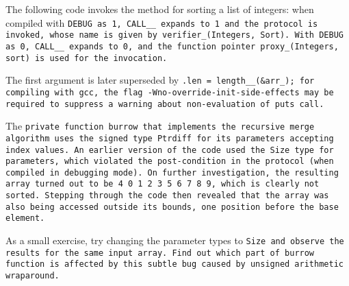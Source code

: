\pagebreak

\example The following code invokes the method for sorting a list of integers:
when compiled with \tt{DEBUG} as \tt{1}, \tt{CALL__} expands to \tt{1} and the
protocol is invoked, whose name is given by \tt{verifier_(Integers, Sort)}.
With \tt{DEBUG} as \tt{0}, \tt{CALL__} expands to \tt{0}, and the
function pointer \tt{proxy_(Integers, sort)} is used for the invocation.


\note The first argument is later superseded by \tt{.len = length__(&arr_)};
for compiling with \tt{gcc}, the flag \tt{-Wno-override-init-side-effects}
may be required to suppress a warning about non-evaluation of \tt{puts} call.

\exercise The \tt{private} function \tt{burrow} that
implements the recursive merge algorithm uses the signed
type \tt{Ptrdiff} for its parameters accepting index values.
An earlier version of the code used the \tt{Size} type for parameters, which
violated the post-condition in the protocol (when compiled in debugging mode).
On further investigation, the resulting array turned out to be
\tt{4 0 1 2 3 5 6 7 8 9}, which is clearly not sorted.
Stepping through the code then revealed that the array was also being
accessed outside its bounds, one position before the base element.

As a small exercise, try changing the parameter types to
\tt{Size} and observe the results for the same input array.
Find out which part of \tt{burrow} function is affected by
this subtle bug caused by unsigned arithmetic wraparound.
